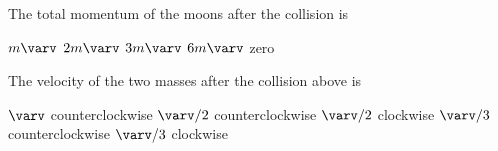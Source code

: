 \documentclass{../../oss-apphys-exam}
\newcounter{last}
\begin{document}
\begin{multicols*}{2}
\begin{questions}
    \question The total momentum of the moons after the collision is
    \begin{choices}
      \choice $m\varv$
      \choice $2m\varv$
      \choice $3m\varv$
      \choice $6m\varv$
      \choice zero
    \end{choices}
    \label{moon1}
    
    \question The velocity of the two masses after the collision above is
    \label{moon2}
    \begin{choices}
      \choice $\varv$ counterclockwise
      \choice $\varv/2$ counterclockwise
      \choice $\varv/2$ clockwise
      \choice $\varv/3$ counterclockwise
      \choice $\varv/3$ clockwise
    \end{choices}
    \vspace{.7in}
    
%    
  \end{questions}
  \setcounter{last}{\value{question}}
\end{multicols*}
\end{document}
